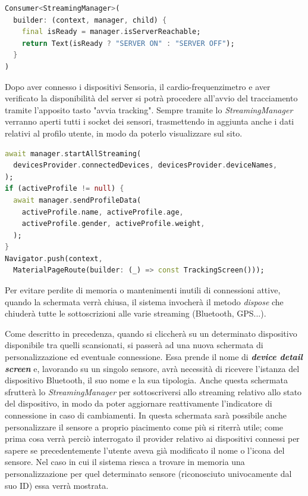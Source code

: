 \documentclass[target=bach,aauheader=,style=]{thud}
\begin{document}
\begin{lstlisting}[language=dart, caption={Lettura dello stato del server tramite provider.}, label={server_status}]
Consumer<StreamingManager>(
  builder: (context, manager, child) {
    final isReady = manager.isServerReachable;
    return Text(isReady ? "SERVER ON" : "SERVER OFF");
  }
)
\end{lstlisting}

Dopo aver connesso i dispositivi Sensoria, il cardio-frequenzimetro e aver verificato la disponibilità del server si potrà procedere all'avvio del tracciamento tramite l'apposito tasto "avvia tracking". Sempre tramite lo \textit{StreamingManager} verranno aperti tutti i socket dei sensori, trasmettendo in aggiunta anche i dati relativi al profilo utente, in modo da poterlo visualizzare sul sito. 

\begin{lstlisting}[language=dart, caption={Avvio degli stream, invio del profilo e navigazione alla TrackingScreen.}, label={start_tracking}]
await manager.startAllStreaming(
  devicesProvider.connectedDevices, devicesProvider.deviceNames,
);
if (activeProfile != null) {
  await manager.sendProfileData(
    activeProfile.name, activeProfile.age,
    activeProfile.gender, activeProfile.weight,
  );
}
Navigator.push(context,
  MaterialPageRoute(builder: (_) => const TrackingScreen()));
\end{lstlisting}
Per evitare perdite di memoria o mantenimenti inutili di connessioni attive, quando la schermata verrà chiusa, il sistema invocherà il metodo \textit{dispose} che chiuderà tutte le sottoscrizioni alle varie streaming (Bluetooth, GPS...).

Come descritto in precedenza, quando si cliccherà su un determinato dispositivo disponibile tra quelli scansionati, si passerà ad una nuova schermata di personalizzazione ed eventuale connessione. Essa prende il nome di \textit{\textbf{device detail screen}} e, lavorando su un singolo sensore, avrà necessità di ricevere l'istanza del dispositivo Bluetooth, il suo nome e la sua tipologia. Anche questa schermata sfrutterà lo \textit{StreamingManager} per sottoscriversi allo streaming relativo allo stato del dispositivo, in modo da poter aggiornare reattivamente l'indicatore di connessione in caso di cambiamenti. In questa schermata sarà possibile anche personalizzare il sensore a proprio piacimento come più si riterrà utile; come prima cosa verrà perciò interrogato il provider relativo ai dispositivi connessi per sapere se precedentemente l'utente aveva già modificato il nome o l'icona del sensore. Nel caso in cui il sistema riesca a trovare in memoria una personalizzazione per quel determinato sensore (riconosciuto univocamente dal suo ID) essa verrà mostrata. 
\end{document}
